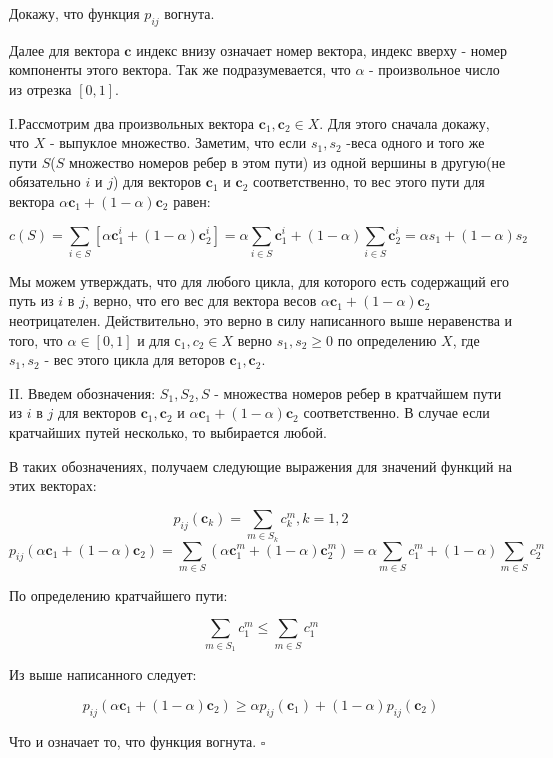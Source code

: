 \documentclass[12pt]{article}
\begin{document}
 
 
Докажу, что функция $p_{ij}$ вогнута. 

Далее для вектора $\textbf{c}$ индекс внизу означает номер вектора, индекс вверху - номер компоненты этого вектора. Так же подразумевается, что $\alpha$ - произвольное число из отрезка $[0,1]$.

I.Рассмотрим два произвольных вектора $\textbf{c}_1,\textbf{c}_2 \in X$. Для этого сначала докажу, что $X$ - выпуклое множество. Заметим, что если $s_1, s_2$ -веса одного и того же пути $S$($S$ множество номеров ребер в этом пути) из одной вершины в другую(не обязательно $i$ и $j$) для векторов $\textbf{c}_1$ и $\textbf{c}_2$ соответственно, то вес этого пути для вектора $\alpha \textbf{c}_1 + (1-\alpha)\textbf{c}_2$ равен:

$$c(S) = \sum\limits_{i\in S}[\alpha \textbf{c}_1^i + (1-\alpha)\textbf{c}_2^i] = \alpha \sum\limits_{i\in S}\textbf{c}_1^i + (1-\alpha)\sum\limits_{i\in S}\textbf{c}_2^i = \alpha s_1 + (1-\alpha)s_2$$

Мы можем утверждать, что для любого цикла, для которого есть содержащий его путь из $i$ в $j$, верно, что его вес для вектора весов $\alpha \textbf{c}_1 + (1-\alpha)\textbf{c}_2$ неотрицателен. Действительно, это верно в силу написанного выше неравенства и того, что $\alpha \in[0,1]$ и для $с_1,c_2 \in X$ верно $s_1,s_2\geq 0$ по определению $X$, где $s_1,s_2$ - вес этого цикла для веторов $\textbf{c}_1,\textbf{c}_2$.

II. Введем обозначения: $S_1, S_2, S$ - множества номеров ребер в кратчайшем пути из $i$ в $j$ для векторов $\textbf{c}_1,\textbf{c}_2$ и $\alpha \textbf{c}_1 + (1-\alpha)\textbf{c}_2$ соответственно. В случае если кратчайших путей несколько, то выбирается любой.

В таких обозначениях, получаем следующие выражения для значений функций на этих векторах:

$$p_{ij}(\textbf{c}_k) = \sum\limits_{m \in S_k}c_k^m, k=1,2$$
$$p_{ij}(\alpha \textbf{c}_1 + (1-\alpha)\textbf{c}_2) = \sum\limits_{m \in S}\left(\alpha \textbf{c}_1^m + (1-\alpha)\textbf{c}_2^m\right) = \alpha\sum\limits_{m \in S}c_1^m+(1-\alpha)\sum\limits_{m \in S}c_2^m$$

По определению кратчайшего пути:

$$\sum\limits_{m \in S_1}c_1^m \leq \sum\limits_{m \in S}c_1^m$$

Из выше написанного следует:

$$p_{ij}(\alpha \textbf{c}_1 + (1-\alpha)\textbf{c}_2) \geq \alpha p_{ij}(\textbf{c}_1) + (1-\alpha)p_{ij}(\textbf{c}_2)$$

Что и означает то, что функция вогнута. $\square$
\end{document}
